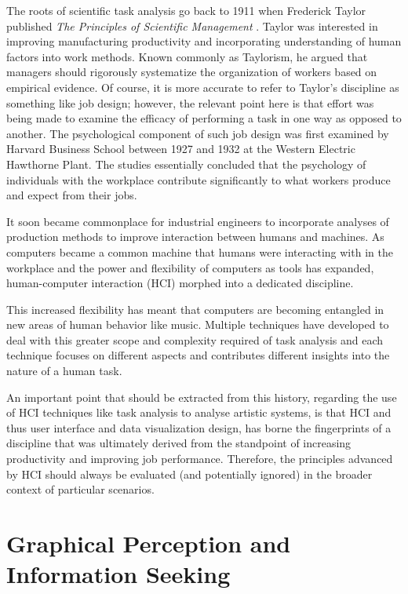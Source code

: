 The roots of scientific task analysis go back to 1911 when Frederick Taylor published \emph{The Principles of Scientific Management} \cite{crystal2004}. Taylor was interested in improving manufacturing productivity and incorporating understanding of human factors into work methods. Known commonly as Taylorism, he argued that managers should rigorously systematize the organization of workers based on empirical evidence. Of course, it is more accurate to refer to Taylor's discipline as something like job design; however, the relevant point here is that effort was being made to examine the efficacy of performing a task in one way as opposed to another. The psychological component of such job design was first examined by Harvard Business School between 1927 and 1932 at the Western Electric Hawthorne Plant. The studies essentially concluded that the psychology of individuals with the workplace contribute significantly to what workers produce and expect from their jobs.

It soon became commonplace for industrial engineers to incorporate analyses of production methods to improve interaction between humans and machines. As computers became a common machine that humans were interacting with in the workplace and the power and flexibility of computers as tools has expanded, human-computer interaction (HCI) morphed into a dedicated discipline. 

This increased flexibility has meant that computers are becoming entangled in new areas of human behavior like music. Multiple techniques have developed to deal with this greater scope and complexity required of task analysis and each technique focuses on different aspects and contributes different insights into the nature of a human task.

An important point that should be extracted from this history, regarding the use of HCI techniques like task analysis to analyse artistic systems, is that HCI and thus user interface and data visualization design, has borne the fingerprints of a discipline that was ultimately derived from the standpoint of increasing productivity and improving job performance. Therefore, the principles advanced by HCI should always be evaluated (and potentially ignored) in the broader context of particular scenarios. 

\section{Graphical Perception and Information Seeking}

